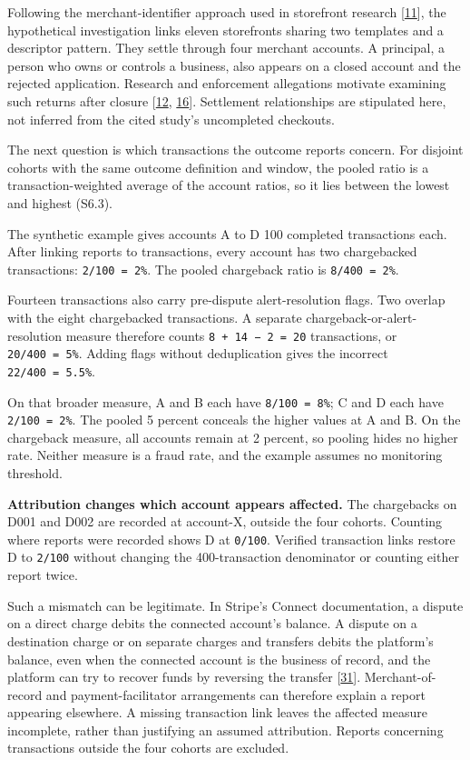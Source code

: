 \documentclass[
  11pt,
]{article}
\begin{document}
Following the merchant-identifier approach used in storefront research
{[}\protect\hyperlink{ref-Bitaab2025}{11}{]}, the hypothetical
investigation links eleven storefronts sharing two templates and a
descriptor pattern. They settle through four merchant accounts. A
principal, a person who owns or controls a business, also appears on a
closed account and the rejected application. Research and enforcement
allegations motivate examining such returns after closure
{[}\protect\hyperlink{ref-McCoy2012}{12},
\protect\hyperlink{ref-FTC2019Allied}{16}{]}. Settlement relationships
are stipulated here, not inferred from the cited study's uncompleted
checkouts.

The next question is which transactions the outcome reports concern. For
disjoint cohorts with the same outcome definition and window, the pooled
ratio is a transaction-weighted average of the account ratios, so it
lies between the lowest and highest (S6.3).

The synthetic example gives accounts A to D 100 completed transactions
each. After linking reports to transactions, every account has two
chargebacked transactions: \mbox{\texttt{2/100\ =\ 2\%}}. The pooled
chargeback ratio is \mbox{\texttt{8/400\ =\ 2\%}}.

Fourteen transactions also carry pre-dispute alert-resolution flags. Two
overlap with the eight chargebacked transactions. A separate
chargeback-or-alert-resolution measure therefore counts
\mbox{\texttt{8\ +\ 14\ −\ 2\ =\ 20}} transactions, or
\mbox{\texttt{20/400\ =\ 5\%}}. Adding flags without deduplication gives
the incorrect \mbox{\texttt{22/400\ =\ 5.5\%}}.

On that broader measure, A and B each have
\mbox{\texttt{8/100\ =\ 8\%}}; C and D each have
\mbox{\texttt{2/100\ =\ 2\%}}. The pooled 5 percent conceals the higher
values at A and B. On the chargeback measure, all accounts remain at 2
percent, so pooling hides no higher rate. Neither measure is a fraud
rate, and the example assumes no monitoring threshold.

\textbf{Attribution changes which account appears affected.} The
chargebacks on D001 and D002 are recorded at account-X, outside the four
cohorts. Counting where reports were recorded shows D at \texttt{0/100}.
Verified transaction links restore D to \texttt{2/100} without changing
the 400-transaction denominator or counting either report twice.

Such a mismatch can be legitimate. In Stripe's Connect documentation, a
dispute on a direct charge debits the connected account's balance. A
dispute on a destination charge or on separate charges and transfers
debits the platform's balance, even when the connected account is the
business of record, and the platform can try to recover funds by
reversing the transfer
{[}\protect\hyperlink{ref-Stripe2026ConnectCharges}{31}{]}.
Merchant-of-record and payment-facilitator arrangements can therefore
explain a report appearing elsewhere. A missing transaction link leaves
the affected measure incomplete, rather than justifying an assumed
attribution. Reports concerning transactions outside the four cohorts
are excluded.
\end{document}
